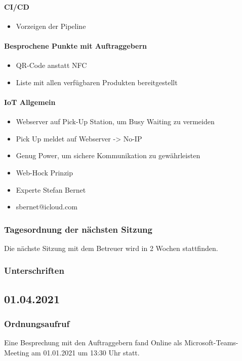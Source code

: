 \paragraph{CI/CD}
\begin{itemize}
	\item Vorzeigen der Pipeline
\end{itemize}
\paragraph{Besprochene Punkte mit Auftraggebern}
\begin{itemize}
	\item QR-Code anstatt NFC	
	\item Liste mit allen verfügbaren Produkten bereitgestellt
\end{itemize}
\paragraph{IoT Allgemein}
\begin{itemize}
	\item Webserver auf Pick-Up Station, um Busy Waiting zu vermeiden
	\item Pick Up meldet auf Webserver -> No-IP
	\item Genug Power, um sichere Kommunikation zu gewährleisten
	\item Web-Hock Prinzip
\end{itemize}
\begin{itemize}
	\item Experte Stefan Bernet
	\item sbernet@icloud.com
\end{itemize}
\subsubsection{Tagesordnung der nächsten Sitzung}
Die nächste Sitzung mit dem Betreuer wird in 2 Wochen stattfinden. 
\subsubsection{Unterschriften}
\newpage
\subsection{01.04.2021}
\subsubsection{Ordnungsaufruf}
Eine Besprechung mit den Auftraggebern fand Online als Microsoft-Teams-Meeting am 01.01.2021 um 13:30 Uhr statt.

